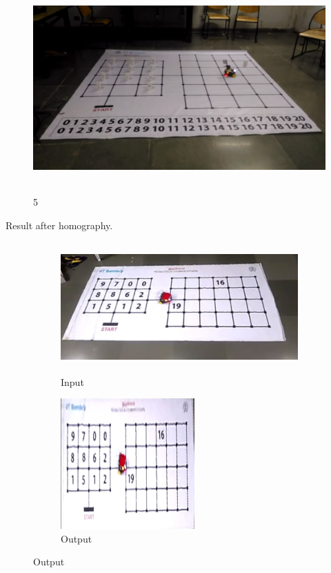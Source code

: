 \documentclass[10pt, a4paper]{beamer}
\begin{document}
\begin{frame}
	\begin{figure}[h!]
		\includegraphics[width=1\linewidth, height=8cm]{Homography/5.png}
		\centering
		\caption{5}
	\end{figure}	
\end{frame}
\begin{frame}
	{\begin{center}
			Result after homography.
		\end{center}}\vspace{-1 cm}
	\begin{figure}[h!]
		\begin{subfigure}{0.4\textwidth}
			\includegraphics[width=1\linewidth, height=5cm]{Homography/homographed/1.jpg}
			\caption{Input}
		\end{subfigure}
		\begin{subfigure}{0.4\textwidth}
			\includegraphics[width=1\linewidth, height=5cm]{Homography/homographed/2.jpg}
			\caption{Output}
		\end{subfigure}
	\end{figure}	
\end{frame}
\end{document}
